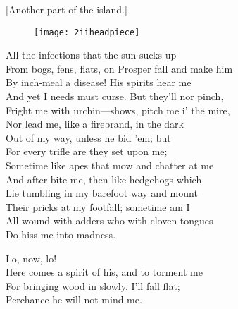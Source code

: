 \cleardoubleoddpage

[Another part of the island.]

\begin{figure}[t!]
\centering
\texttt{[image: 2iiheadpiece]}
\end{figure}


\begin{verse_speech}[Caliban] 
All the infections that the sun sucks up\\
From bogs, fens, flats, on Prosper fall and make him\\
By inch-meal a disease! His spirits hear me\\
And yet I needs must curse. But they'll nor pinch,\\
Fright me with urchin—shows, pitch me i' the mire,\\
Nor lead me, like a firebrand, in the dark\\
Out of my way, unless he bid 'em; but\\
For every trifle are they set upon me;\\
Sometime like apes that mow and chatter at me\\
And after bite me, then like hedgehogs which\\
Lie tumbling in my barefoot way and mount\\
Their pricks at my footfall; sometime am I\\
All wound with adders who with cloven tongues\\
Do hiss me into madness.


Lo, now, lo!\\
Here comes a spirit of his, and to torment me\\
For bringing wood in slowly. I'll fall flat;\\
Perchance he will not mind me.
\end{verse_speech}

